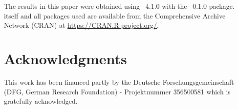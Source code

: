 \documentclass[article]{jss}
\begin{document}
The results in this paper were obtained using
~4.1.0 with the
~0.1.0 package.  itself
and all packages used are available from the Comprehensive
 Archive Network (CRAN) at \url{https://CRAN.R-project.org/}.


\section*{Acknowledgments}
This work has been financed partly by the Deutsche Forschungsgemeinschaft (DFG, German Research Foundation) - Projektnummer 356500581 which is gratefully acknowledged.










\end{document}
